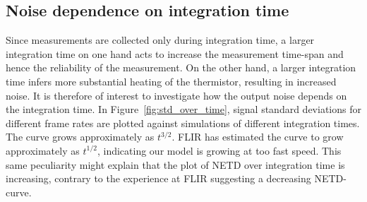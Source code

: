 \subsection{Noise dependence on integration time}
Since measurements are collected only during integration time, a larger integration time on one hand acts to increase the measurement time-span and hence the
reliability of the measurement. On the other hand, a larger integration time infers more substantial heating of the thermistor, resulting in increased noise. It is therefore
of interest to investigate how the output noise depends on the integration time. In Figure~\ref{fig:std_over_time}, signal standard deviations for different frame rates
are plotted against simulations of different integration times. The curve grows approximately as $t^{3/2}$. FLIR has estimated the curve to grow approximately as $t^{1/2}$, indicating
our model is growing at too fast speed. This same peculiarity might explain that the plot of NETD over integration time is increasing, contrary to the experience at FLIR suggesting
a decreasing NETD-curve.
